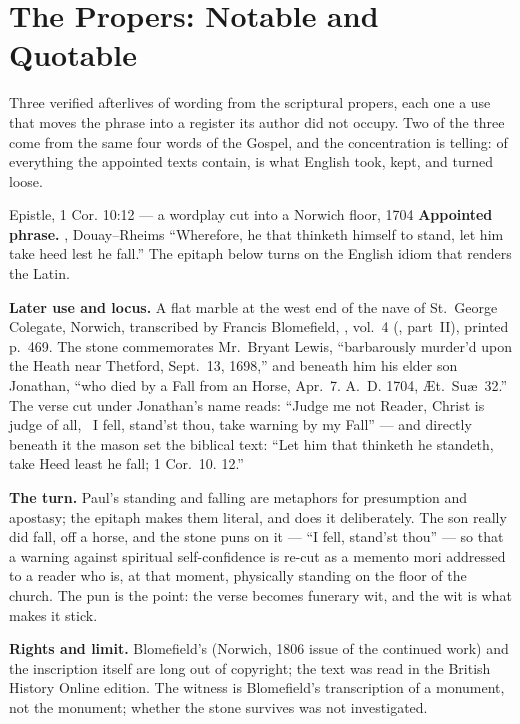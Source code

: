 \sectionguard
\section*{The Propers: Notable and Quotable}

Three verified afterlives of wording from the scriptural propers, each one a
use that moves the phrase into a register its author did not occupy. Two of
the three come
from the same four words of the Gospel, and the concentration is telling: of
everything the appointed texts contain,  is what English took, kept,
and turned loose.

\begin{afterlife}{Epistle, 1 Cor. 10:12 --- a wordplay cut into a Norwich floor, 1704}
\textbf{Appointed phrase.} , Douay--Rheims ``Wherefore, he that thinketh himself to stand, let him
take heed lest he fall.'' The epitaph below turns on the English idiom that
renders the Latin.

\textbf{Later use and locus.} A flat marble at the west end of the nave of
St.\ George Colegate, Norwich, transcribed by Francis Blomefield, , vol.~4
(, part~II), printed
p.~469. The stone commemorates Mr.\ Bryant Lewis, ``barbarously murder'd upon
the Heath near Thetford, Sept.\ 13, 1698,'' and beneath him his elder son
Jonathan, ``who died by a Fall from an Horse, Apr.\ 7. A.~D. 1704, \AE t.\
Su\ae\ 32.'' The verse cut under Jonathan's name reads: ``Judge me not Reader,
Christ is judge of all, \textbar\ I fell, stand'st thou, take warning by my
Fall'' --- and directly beneath it the mason set the biblical text: ``Let him
that thinketh he standeth, take Heed least he fall; 1 Cor.\ 10. 12.''

\textbf{The turn.} Paul's standing and falling are metaphors for presumption
and apostasy; the epitaph makes them literal, and does it deliberately. The
son really did fall, off a horse, and the stone puns on it --- ``I fell,
stand'st thou'' --- so that a warning against spiritual self-confidence is
re-cut as a memento mori addressed to a reader who is, at that moment,
physically standing on the floor of the church. The pun is the point: the
verse becomes funerary wit, and the wit is what makes it stick.

\textbf{Rights and limit.} Blomefield's  (Norwich, 1806 issue of
the continued work) and the inscription itself are long out of copyright; the
text was read in the British History Online edition. The witness is
Blomefield's transcription of a monument, not the monument; whether the stone
survives was not investigated.
\end{afterlife}

